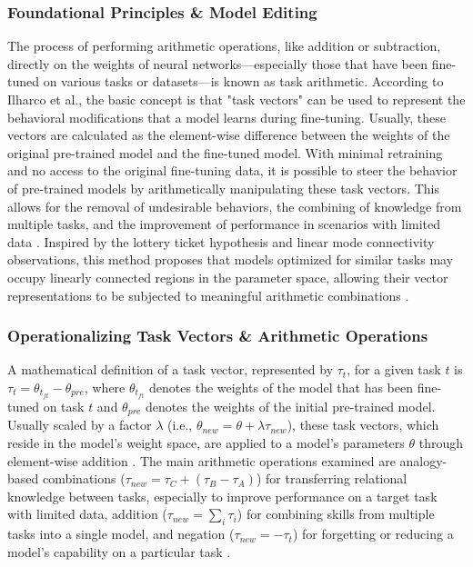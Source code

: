 \documentclass{DESSThesis}
\begin{document}
\subsubsection{Foundational Principles \& Model Editing}
The process of performing arithmetic operations, like addition or subtraction, directly on the weights of neural networks—especially those that have been fine-tuned on various tasks or datasets—is known as task arithmetic. According to Ilharco et al., the basic concept is that "task vectors" can be used to represent the behavioral modifications that a model learns during fine-tuning. Usually, these vectors are calculated as the element-wise difference between the weights of the original pre-trained model and the fine-tuned model. With minimal retraining and no access to the original fine-tuning data, it is possible to steer the behavior of pre-trained models by arithmetically manipulating these task vectors. This allows for the removal of undesirable behaviors, the combining of knowledge from multiple tasks, and the improvement of performance in scenarios with limited data \cite{ilharco_editing_2023}. Inspired by the lottery ticket hypothesis and linear mode connectivity observations, this method proposes that models optimized for similar tasks may occupy linearly connected regions in the parameter space, allowing their vector representations to be subjected to meaningful arithmetic combinations \cite{chronopoulou_language_2023,ilharco_editing_2023}.

\subsubsection{Operationalizing Task Vectors \& Arithmetic Operations}
A mathematical definition of a task vector, represented by $\tau_t$, for a given task $t$ is $\tau_t = \theta_{t_{ft}} - \theta_{pre}$, where $\theta_{t_{ft}}$ denotes the weights of the model that has been fine-tuned on task $t$ and $\theta_{pre}$ denotes the weights of the initial pre-trained model. Usually scaled by a factor $\lambda$ (i.e., $\theta_{new} = \theta + \lambda \tau_{new}$), these task vectors, which reside in the model's weight space, are applied to a model's parameters $\theta$ through element-wise addition \cite{ilharco_editing_2023}. The main arithmetic operations examined are analogy-based combinations ($\tau_{new} = \tau_C + (\tau_B - \tau_A)$) for transferring relational knowledge between tasks, especially to improve performance on a target task with limited data, addition ($\tau_{new} = \sum_i \tau_i$) for combining skills from multiple tasks into a single model, and negation ($\tau_{new} = -\tau_t$) for forgetting or reducing a model's capability on a particular task \cite{ilharco_editing_2023}.
\end{document}
